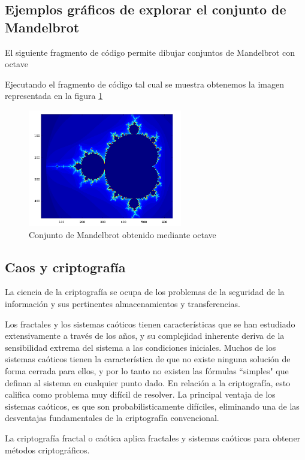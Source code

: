 \subsection{Ejemplos gráficos de explorar el conjunto de Mandelbrot}
El siguiente fragmento de código permite dibujar conjuntos de Mandelbrot con octave

%

Ejecutando el fragmento de código tal cual se muestra obtenemos la imagen representada en la figura \ref{fig:MandelbrotOctave}
\begin{figure}[hbtp]
\centering
\includegraphics[width = 0.6\textwidth]{img/mandelbrotOctave.png}
\caption{Conjunto de Mandelbrot obtenido mediante octave}
\label{fig:MandelbrotOctave}
\end{figure}

\subsection{Caos y criptografía}
La ciencia de la criptografía se ocupa de los problemas de la seguridad de la información y sus pertinentes almacenamientos y transferencias.

Los fractales y los sistemas caóticos tienen características que se han estudiado extensivamente a través de los años, y su complejidad inherente deriva de la sensibilidad extrema del sistema a las condiciones iniciales. Muchos de los sistemas caóticos tienen la característica de que no existe ninguna solución de forma cerrada para ellos, y por lo tanto no existen las fórmulas ``simples" que definan al sistema en cualquier punto dado. En relación a la criptografía, esto califica como problema muy difícil de resolver. La principal ventaja de los sistemas caóticos, es que son probabilisticamente difíciles, eliminando una de las desventajas fundamentales de la criptografía convencional.

\begin{definition}
La criptografía fractal o caótica aplica fractales y sistemas caóticos para obtener métodos criptográficos.
\end{definition}

